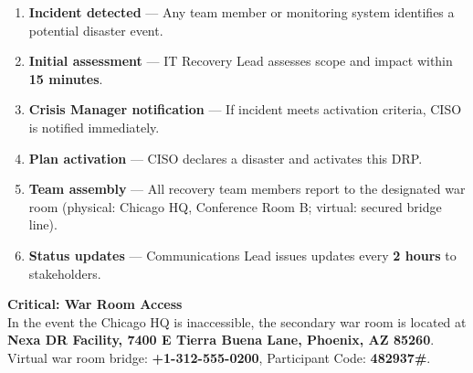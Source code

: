 \begin{enumerate}[nosep, leftmargin=*]
  \item \textbf{Incident detected} --- Any team member or monitoring system identifies a potential disaster event.
  \item \textbf{Initial assessment} --- IT Recovery Lead assesses scope and impact within \textbf{15 minutes}.
  \item \textbf{Crisis Manager notification} --- If incident meets activation criteria, CISO is notified immediately.
  \item \textbf{Plan activation} --- CISO declares a disaster and activates this DRP.
  \item \textbf{Team assembly} --- All recovery team members report to the designated war room (physical: Chicago HQ, Conference Room B; virtual: secured bridge line).
  \item \textbf{Status updates} --- Communications Lead issues updates every \textbf{2 hours} to stakeholders.
\end{enumerate}

\begin{alertbox}
\textbf{Critical: War Room Access}\\[4pt]
In the event the Chicago HQ is inaccessible, the secondary war room is located at \textbf{Nexa DR Facility, 7400 E Tierra Buena Lane, Phoenix, AZ 85260}. Virtual war room bridge: \textbf{+1-312-555-0200}, Participant Code: \textbf{482937\#}.
\end{alertbox}

\clearpage
